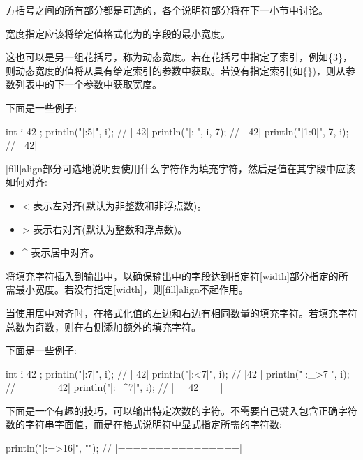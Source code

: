 方括号之间的所有部分都是可选的，各个说明符部分将在下一小节中讨论。


宽度指定应该将给定值格式化为的字段的最小宽度。

这也可以是另一组花括号，称为动态宽度。若在花括号中指定了索引，例如\{3\}，则动态宽度的值将从具有给定索引的参数中获取。若没有指定索引(如\{\})，则从参数列表中的下一个参数中获取宽度。

下面是一些例子:

\begin{cpp}
int i { 42 };
println("|{:5}|", i);        // |    42|
println("|{:{}}|", i, 7);    // |       42|
println("|{1:{0}}|", 7, i);  // |       42|
\end{cpp}



[fill]align部分可选地说明要使用什么字符作为填充字符，然后是值在其字段中应该如何对齐:

\begin{itemize}
\item
< 表示左对齐(默认为非整数和非浮点数)。

\item
> 表示右对齐(默认为整数和浮点数)。

\item
\^{} 表示居中对齐。
\end{itemize}

将填充字符插入到输出中，以确保输出中的字段达到指定符[width]部分指定的所需最小宽度。若没有指定[width]，则[fill]align不起作用。

当使用居中对齐时，在格式化值的左边和右边有相同数量的填充字符。若填充字符总数为奇数，则在右侧添加额外的填充字符。

下面是一些例子:

\begin{cpp}
int i { 42 };
println("|{:7}|", i);     // |     42|
println("|{:<7}|", i);    // |42     |
println("|{:_>7}|", i);   // |_____42|
println("|{:_^7}|", i);   // |__42___|
\end{cpp}

下面是一个有趣的技巧，可以输出特定次数的字符。不需要自己键入包含正确字符数的字符串字面值，而是在格式说明符中显式指定所需的字符数:

\begin{cpp}
println("|{:=>16}|", ""); // |================|
\end{cpp}


